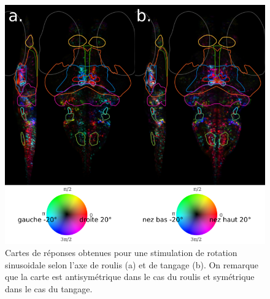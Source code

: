 \begin{figure}
\centering
\includegraphics[width=1\textwidth]{./files/tilt_roll.svg.png}
\caption{Cartes de réponses obtenues pour une stimulation de rotation sinusoidale selon l'axe de roulis (a) et de tangage (b). On remarque que la carte est antisymétrique dans le cas du roulis et symétrique dans le cas du tangage.
}
\end{figure}
    










